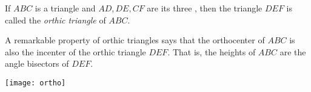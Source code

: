 \documentclass[12pt]{article}
\begin{document}
If $ABC$ is a triangle and $AD, DE, CF$ are its three , then the triangle $DEF$ is called the \emph{orthic triangle} of $ABC$.

A remarkable property of orthic triangles says that the orthocenter of $ABC$ is also the incenter of the orthic triangle $DEF$. That is, the heights of $ABC$ are the angle bisectors of $DEF$.

\begin{center}
\texttt{[image: ortho]}
\end{center}
\end{document}
